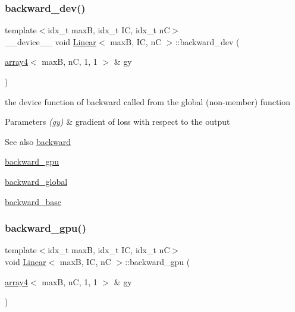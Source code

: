 \subsubsection{\texorpdfstring{backward\+\_\+dev()}{backward\_dev()}}
{\footnotesize\ttfamily template$<$idx\+\_\+t maxB, idx\+\_\+t IC, idx\+\_\+t nC$>$ \\
\+\_\+\+\_\+device\+\_\+\+\_\+ void \hyperlink{structLinear}{Linear}$<$ maxB, IC, nC $>$\+::backward\+\_\+dev (\begin{DoxyParamCaption}\item[{\hyperlink{structarray4}{array4}$<$ maxB, nC, 1, 1 $>$ \&}]{gy }\end{DoxyParamCaption})\hspace{0.3cm}{\ttfamily [inline]}}



the device function of backward called from the global (non-\/member) function 


\begin{DoxyParams}{Parameters}
{\em (gy)} & gradient of loss with respect to the output \\
\hline
\end{DoxyParams}
\begin{DoxySeeAlso}{See also}
\hyperlink{structLinear_aeaa39d38b876fbd70794621955193fd3}{backward} 

\hyperlink{structLinear_acc4936542d24da1357c1c7fb7f95d6ea}{backward\+\_\+gpu} 

\hyperlink{softmaxcrossentropy_8h_a47d56a9a23e08247b227f4aac17413e0}{backward\+\_\+global} 

\hyperlink{structLinear_adcabfb5486aad2c05dd94bae98acf168}{backward\+\_\+base} 
\end{DoxySeeAlso}
\mbox{\label{structLinear_acc4936542d24da1357c1c7fb7f95d6ea}} 
\subsubsection{\texorpdfstring{backward\+\_\+gpu()}{backward\_gpu()}}
{\footnotesize\ttfamily template$<$idx\+\_\+t maxB, idx\+\_\+t IC, idx\+\_\+t nC$>$ \\
void \hyperlink{structLinear}{Linear}$<$ maxB, IC, nC $>$\+::backward\+\_\+gpu (\begin{DoxyParamCaption}\item[{\hyperlink{structarray4}{array4}$<$ maxB, nC, 1, 1 $>$ \&}]{gy }\end{DoxyParamCaption})\hspace{0.3cm}{\ttfamily [inline]}}




